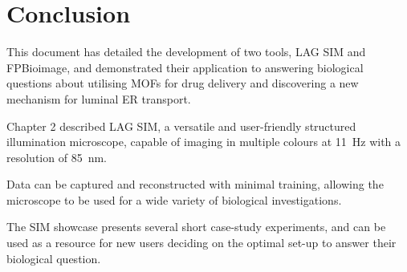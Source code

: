 \chapter{Conclusion}
\label{chap:conclusion}


\ifpdf
    \graphicspath{{Chapter6/Figs/Raster/}{Chapter6/Figs/PDF/}{Chapter6/Figs/}}
\else
    \graphicspath{{Chapter6/Figs/Vector/}{Chapter6/Figs/}}
\fi

This document has detailed the development of two tools, LAG SIM and FPBioimage, and demonstrated their application to answering biological questions about utilising MOFs for drug delivery and discovering a new mechanism for luminal ER transport. 




Chapter 2 described LAG SIM, a versatile and user-friendly structured illumination microscope, capable of imaging in multiple colours at \SI{11}{\hertz} with a resolution of \SI{85}{\nano\metre}. 


Data can be captured and reconstructed with minimal training, allowing the microscope to be used for a wide variety of biological investigations. 


The SIM showcase presents several short case-study experiments, and can be used as a resource for new users deciding on the optimal set-up to answer their biological question. 



